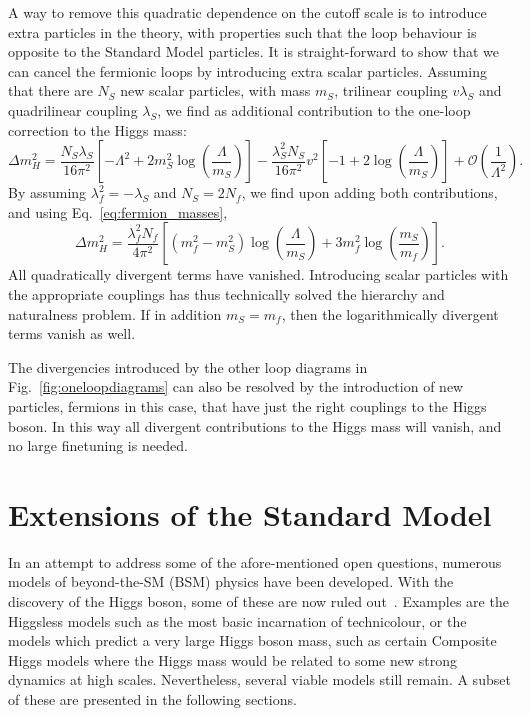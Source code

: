 A way to remove this quadratic dependence on the cutoff scale is to introduce extra particles in
the theory, with properties such that the loop behaviour is opposite to the Standard Model
particles. It is straight-forward to show that we can cancel the fermionic loops by introducing
extra scalar particles. 
Assuming that there are $N_S$ new scalar particles, with mass $m_S$, trilinear coupling $v\lambda_S$
and quadrilinear coupling $\lambda_S$, we find as additional contribution to the
one-loop correction to the Higgs mass:
\begin{equation}
  \Delta m_H^2 =  \frac{N_S\lambda_S}{16\pi^2} \left[ - \Lambda^2 + 2 m_S^2 \log
\left(\frac{\Lambda}{m_S}\right)\right] - \frac{\lambda_S^2 N_S}{16 \pi^2} v^2 \left[ -1 + 2
\log\left(\frac{\Lambda}{m_S}\right) \right] + \mathcal{O}\left(\frac{1}{\Lambda^2}\right) .
\end{equation}
By assuming $\lambda_f^2 = - \lambda_S$ and $N_S = 2 N_f$, we find upon adding both
contributions, and using Eq.~\ref{eq:fermion_masses},
\begin{equation}
  \Delta m_H^2 = \frac{\lambda_f^2 N_f}{4\pi^2} \left[ \left(m_f^2-m_S^2\right)
\log\left(\frac{\Lambda}{m_S}\right) + 3 m_f^2 \log\left(\frac{m_S}{m_f}\right) \right] .
\end{equation}
All quadratically divergent terms have vanished. Introducing scalar particles with the
appropriate couplings has thus technically solved the hierarchy and naturalness problem. 
If in addition $m_S = m_f$, then the logarithmically divergent terms vanish as well. 

The divergencies introduced by the other loop diagrams in Fig.~\ref{fig:oneloopdiagrams} can also be
resolved by the introduction of new particles, fermions in this case, that have just the right
couplings to the Higgs boson. In this way all divergent contributions to the Higgs mass will
vanish, and no large finetuning is needed. 


\section{Extensions of the Standard Model \label{sec:extensions_standard_model}}


In an attempt to address some of the afore-mentioned open questions, numerous models of
beyond-the-SM (BSM) physics have been developed. With the discovery of the Higgs boson, some of
these are now ruled out~\cite{Cheng:2007bu}. Examples are the Higgsless models such as the most
basic incarnation of technicolour, or the models which predict a very large Higgs boson mass, such
as certain Composite Higgs models where the Higgs mass would be related to some new strong dynamics
at high scales. 
Nevertheless, several viable models still remain. A subset of these are presented in the following
sections.

